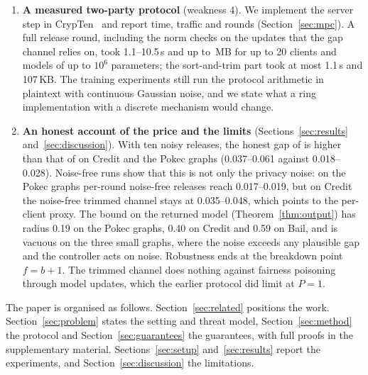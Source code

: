 \begin{enumerate}
\item \textbf{A measured two-party protocol} (weakness 4). We implement the server step in CrypTen~\citep{knott2021crypten} and report time, traffic and rounds (Section~\ref{sec:mpc}). A full release round, including the norm checks on the updates that the gap channel relies on, took 1.1--10.5\,s and up to \mpcFullMB\,MB for up to 20 clients and models of up to $10^6$ parameters; the sort-and-trim part took at most 1.1\,s and 107\,KB. The training experiments still run the protocol arithmetic in plaintext with continuous Gaussian noise, and we state what a ring implementation with a discrete mechanism would change.
\item \textbf{An honest account of the price and the limits} (Sections~\ref{sec:results} and~\ref{sec:discussion}). With ten noisy releases, the honest gap of \rt{} is higher than that of \clamp{} on Credit and the Pokec graphs (0.037--0.061 against 0.018--0.028). Noise-free runs show that this is not only the privacy noise: on the Pokec graphs per-round noise-free releases reach 0.017--0.019, but on Credit the noise-free trimmed channel stays at 0.035--0.048, which points to the per-client proxy. The bound on the returned model (Theorem~\ref{thm:output}) has radius 0.19 on the Pokec graphs, 0.40 on Credit and 0.59 on Bail, and is vacuous on the three small graphs, where the noise exceeds any plausible gap and the controller acts on noise. Robustness ends at the breakdown point $f=b+1$. The trimmed channel does nothing against fairness poisoning through model updates, which the earlier protocol did limit at $P=1$.
\end{enumerate}

The paper is organised as follows. Section~\ref{sec:related} positions the work. Section~\ref{sec:problem} states the setting and threat model, Section~\ref{sec:method} the protocol and Section~\ref{sec:guarantees} the guarantees, with full proofs in the supplementary material. Sections~\ref{sec:setup} and~\ref{sec:results} report the experiments, and Section~\ref{sec:discussion} the limitations.
